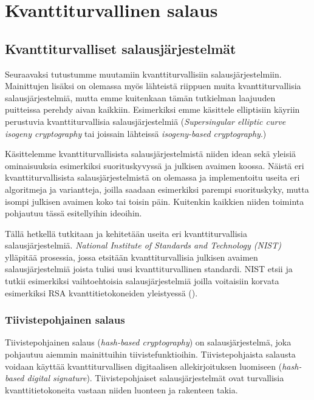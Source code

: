 \chapter{Kvanttiturvallinen salaus\label{results}}

\section{Kvanttiturvalliset salausjärjestelmät}

Seuraavaksi tutustumme muutamiin kvanttiturvallisiin salausjärjestelmiin. Mainittujen lisäksi on olemassa myös lähteistä riippuen muita kvanttiturvallisia salausjärjestelmiä, mutta emme kuitenkaan tämän tutkielman laajuuden puitteissa perehdy aivan kaikkiin. Esimerkiksi emme käsittele elliptisiin käyriin perustuvia kvanttiturvallisia salausjärjestelmiä (\emph{Supersingular elliptic curve isogeny cryptography} tai joissain lähteissä \emph{isogeny-based cryptography}.)


Käsittelemme kvanttiturvallisista salausjärjestelmistä niiden idean sekä yleisiä ominaisuuksia esimerkiksi suorituskyvyssä ja julkisen avaimen koossa. Näistä eri kvanttiturvallisista salausjärjestelmistä on olemassa ja implementoitu useita eri algoritmeja ja variantteja, joilla saadaan esimerkiksi parempi suorituskyky, mutta isompi julkisen avaimen koko tai toisin päin. Kuitenkin kaikkien niiden toiminta pohjautuu tässä esitellyihin ideoihin.

Tällä hetkellä tutkitaan ja kehitetään useita eri kvanttiturvallisia salausjärjestelmiä. \emph{National Institute of Standards and Technology (NIST)} ylläpitää prosessia, jossa etsitään kvanttiturvallisia julkisen avaimen salausjärjestelmiä joista tulisi uusi kvanttiturvallinen standardi. NIST etsii ja tutkii esimerkiksi vaihtoehtoisia salausjärjestelmiä joilla voitaisiin korvata esimerkiksi RSA kvanttitietokoneiden yleistyessä (\cite{alagic2020status}).

\subsection{Tiivistepohjainen salaus}
Tiivistepohjainen salaus (\emph{hash-based cryptography}) on salausjärjestelmä, joka pohjautuu aiemmin mainittuihin tiivistefunktioihin. Tiivistepohjaista salausta voidaan käyttää kvanttiturvallisen digitaalisen allekirjoituksen luomiseen (\emph{hash-based digital signature}). Tiivistepohjaiset salausjärjestelmät ovat turvallisia kvanttitietokoneita vastaan niiden luonteen ja rakenteen takia. 

